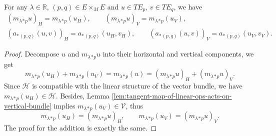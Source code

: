 \begin{lemma}\label{lem:H-compatible-with-linear-str}
    For any $\lambda\in\mathbb{R},\,(p,q)\in E\times_M E$ and $u\in TE_p,\,v\in TE_q$, we have 
    \begin{gather*}
        (m_{\lambda}{}_*{}_p u)_H = m_{\lambda}{}_*{}_p(u_H), \qquad (m_{\lambda}{}_*{}_p u)_V = m_{\lambda}{}_*{}_p(u_V), \\
        (a_*{}_{(p,q)}(u,v))_H = a_*{}_{(p,q)}(u_H,v_H), \qquad (a_*{}_{(p,q)}(u,v))_V = a_*{}_{(p,q)}(u_V,v_V).
    \end{gather*}
\end{lemma}
\begin{proof}
    Decompose $u$ and $m_{\lambda}{}_*{}_p u$ into their horizontal and vertical components, we get 
    \begin{equation*}
        m_{\lambda}{}_*{}_p(u_H) + m_{\lambda}{}_*{}_p(u_V) = m_{\lambda}{}_*{}_p(u) 
        = (m_{\lambda}{}_*{}_p u)_H + (m_{\lambda}{}_*{}_p u)_V.
    \end{equation*}
    Since $\mathcal{H}$ is compatible with the linear structure of the vector bundle, 
    we have $m_{\lambda}{}_*{}_p(u_H)\in \mathcal{H}$. Besides, 
    Lemma \ref{lem:tangent-map-of-linear-ops-acts-on-vertical-bundle} implies 
    $m_{\lambda}{}_*{}_p(u_V)\in \mathcal{V}$, thus 
    \begin{equation*}
        m_{\lambda}{}_*{}_p(u_H) = (m_{\lambda}{}_*{}_p u)_H, \qquad m_{\lambda}{}_*{}_p(u_V) = (m_{\lambda}{}_*{}_p u)_V.
    \end{equation*}
    The proof for the addition is exactly the same.
\end{proof}

